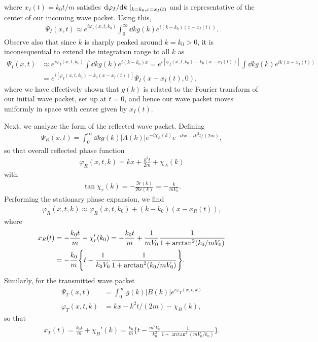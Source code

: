 where $x_{I}(t) = k_0 t / m$ satisfies $\dv*{\varphi_{I}}{k}|_{k=k_0,x=x_{I}(t)}$ and is representative of the center of our incoming wave packet.
Using this, 
\begin{align}
    \Psi_{I}(x,t) \approx e^{i \varphi_{I}(x,t,k_{0})} \int_{0}^{\infty} \dd{k} g(k) e^{i (k - k_0) (x - x_{I}(t))}
.\end{align}
Observe also that since $k$ is sharply peaked around $k = k_0 > 0$, it is inconsequential to extend the integration range to all $k$ as
\begin{align}
    \Psi_{I}(x,t) &\approx e^{i \varphi_{I}(x,t,k_0)} \int \dd{k} g(k) e^{i (k - k_0) x} = e^{i [ \varphi_{I}(x,t,k_0) - k_0 (x - x_{I}(t)) ]} \int \dd{k} g(k) e^{i k ( x - x_{I}(t) )} \nonumber \\
                  &= e^{i[\varphi_{I}(x,t,k_0) - k_0 (x - x_{I}(t))]} \Psi_{I}(x - x_{I}(t),0)
,\end{align}
where we have effectively shown that $g(k)$ is related to the Fourier transform of our initial wave packet, set up at $t = 0$, and hence our wave packet moves uniformly in space with center given by $x_{I}(t)$.

Next, we analyze the form of the reflected wave packet.
Defining
\begin{align}
    \Psi_{R}(x,t) = \int_{0}^{\infty} \dd{k} g(k) |A(k)| e^{-i \chi_{A}(k)} e^{-i k x - i k^2 t / (2m)}
,\end{align}
so that overall reflected phase function
\begin{align}
    \varphi_{R}(x,t,k) = kx + \frac{k^2 t}{2m} + \chi_{A}(k)
\end{align}
with
\begin{align}
    \tan{\chi_{r}(k)} = - \frac{\Im{r(k)}}{\Re{r(k)}} = -\frac{k}{m V_0}
.\end{align}
Performing the stationary phase expansion, we find
\begin{align}
    \varphi_{R}(x,t,k) \approx \varphi_{R}(x,t,k_0) + (k - k_0) (x - x_{R}(t))
,\end{align}
where 
\begin{align}
    x_{R}(t) &= - \frac{k_0 t}{m} - \chi_{r}'(k_0) = -\frac{k_0 t}{m} + \frac{1}{m V_0} \frac{1}{1 + {\rm arctan}^2(k_0 / m V_0)} \nonumber \\
    &= -\frac{k_0}{m} \Bigg\{ t - \frac{1}{k_0 V_0} \frac{1}{1 + \arctan^2(k_0/m V_0)} \Bigg\}
.\end{align}
Similarly, for the transmitted wave packet
\begin{align}
    \Psi_{T}(x,t) &= \int_{0}^{\infty} g(k) |B(k)| e^{i \varphi_{T}(x,t,k)} \\
    \varphi_{T}(x,t,k) &= k x - k^2 t / (2m) - \chi_{B}(k)
,\end{align}
so that
\begin{align}
    x_{T}(t) = \frac{k_0 t}{m} + \chi_{B}'(k) = \frac{k_0}{m} \Bigg\{ t - \frac{m^2 V_0}{k_0^3} \frac{1}{1 + \arctan^2(m V_0 / k_0)} \Bigg\}
.\end{align}


